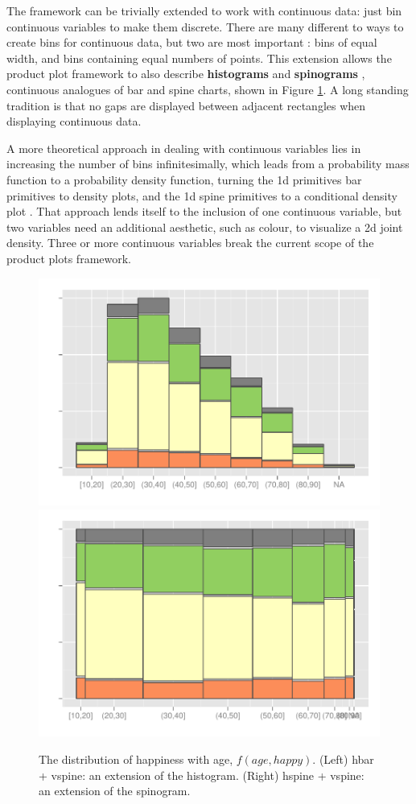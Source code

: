 \documentclass[journal]{vgtc}
\begin{document}
The framework can be trivially extended to work with continuous data: just  bin continuous variables to make them discrete. There are many different to ways to create bins for continuous data, but two are most important \citep{denby:2009}: bins of equal width, and bins containing equal numbers of points. This extension allows the product plot framework to also describe {\bf histograms} and {\bf spinograms} \citep{hummel:1996}, continuous analogues of bar and spine charts, shown in Figure \ref{fig:cont-examples}. A long standing tradition is that no gaps are displayed between adjacent rectangles when displaying continuous data. 

A more theoretical approach in dealing with continuous variables lies in increasing the number of bins infinitesimally, which leads from a probability mass function to a probability density function, turning the 1d primitives bar primitives to density plots, and the 1d spine primitives to a conditional density plot \citep{hofmann:2005}. That approach lends itself to the inclusion of one continuous variable, but two variables need an additional aesthetic, such as colour, to visualize a 2d joint density. Three or more continuous variables break the current scope of the product plots framework.

\begin{figure}[htbp]
  \centering
  \includegraphics[width=0.5\linewidth]{cont-hbar}%
  \includegraphics[width=0.5\linewidth]{cont-hspine}
  
  \caption{The distribution of happiness with age, $f(age, happy)$. (Left) hbar + vspine: an extension of the histogram. (Right) hspine + vspine: an extension of the spinogram.}
  \label{fig:cont-examples}
\end{figure}
\end{document}
